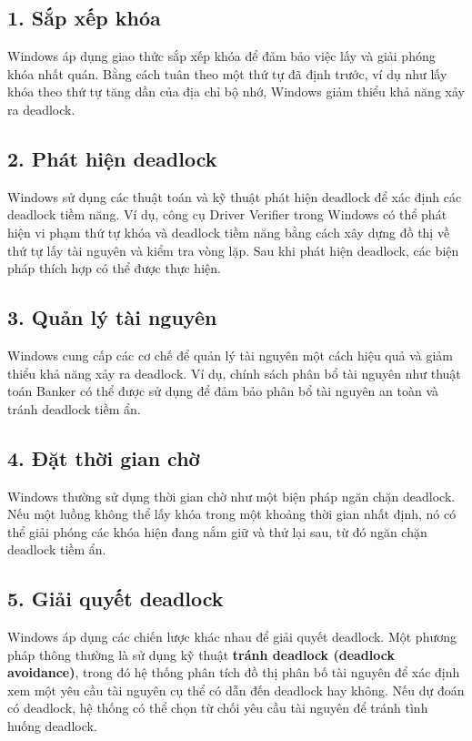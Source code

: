 \documentclass[12pt]{report}
\begin{document}
\subsection*{1. Sắp xếp khóa}
Windows áp dụng giao thức sắp xếp khóa để đảm bảo việc lấy và giải phóng khóa nhất quán. Bằng cách tuân theo một thứ tự đã định trước, ví dụ như lấy khóa theo thứ tự tăng dần của địa chỉ bộ nhớ, Windows giảm thiểu khả năng xảy ra deadlock.
\subsection*{2. Phát hiện deadlock}
Windows sử dụng các thuật toán và kỹ thuật phát hiện deadlock để xác định các deadlock tiềm năng. Ví dụ, công cụ Driver Verifier trong Windows có thể phát hiện vi phạm thứ tự khóa và deadlock tiềm năng bằng cách xây dựng đồ thị về thứ tự lấy tài nguyên và kiểm tra vòng lặp. Sau khi phát hiện deadlock, các biện pháp thích hợp có thể được thực hiện.
\subsection*{3. Quản lý tài nguyên}
Windows cung cấp các cơ chế để quản lý tài nguyên một cách hiệu quả và giảm thiểu khả năng xảy ra deadlock. Ví dụ, chính sách phân bổ tài nguyên như thuật toán Banker có thể được sử dụng để đảm bảo phân bổ tài nguyên an toàn và tránh deadlock tiềm ẩn.
\subsection*{4. Đặt thời gian chờ}
Windows thường sử dụng thời gian chờ như một biện pháp ngăn chặn deadlock. Nếu một luồng không thể lấy khóa trong một khoảng thời gian nhất định, nó có thể giải phóng các khóa hiện đang nắm giữ và thử lại sau, từ đó ngăn chặn deadlock tiềm ẩn.
\subsection*{5. Giải quyết deadlock}
Windows áp dụng các chiến lược khác nhau để giải quyết deadlock. Một phương pháp thông thường là sử dụng kỹ thuật \textbf{tránh deadlock (deadlock avoidance)}, trong đó hệ thống phân tích đồ thị phân bố tài nguyên để xác định xem một yêu cầu tài nguyên cụ thể có dẫn đến deadlock hay không. Nếu dự đoán có deadlock, hệ thống có thể chọn từ chối yêu cầu tài nguyên để tránh tình huống deadlock.
\end{document}
